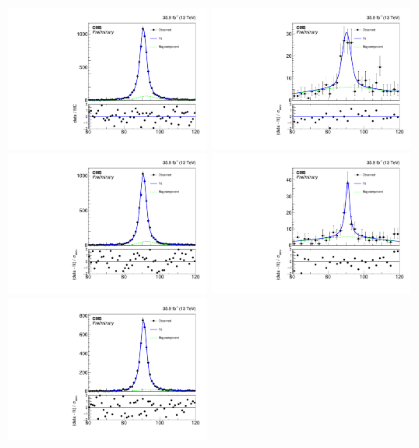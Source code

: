 \begin{figure}[htbp]
  \begin{center}
    \includegraphics[width=0.47\textwidth]{Analysis/Figures/fit_data_ee_pt_175_200.pdf}
    \includegraphics[width=0.47\textwidth]{Analysis/Figures/fit_data_eg_pt_175_200.pdf}
    \includegraphics[width=0.47\textwidth]{Analysis/Figures/fit_data_ee_pt_200_250.pdf}
    \includegraphics[width=0.47\textwidth]{Analysis/Figures/fit_data_eg_pt_200_250.pdf}
    \includegraphics[width=0.47\textwidth]{Analysis/Figures/fit_data_ee_pt_250_6500.pdf}

\end{center}
\end{figure}
